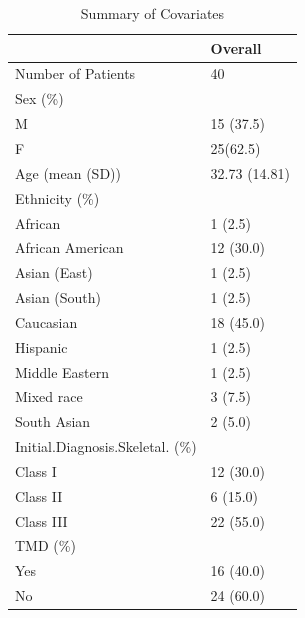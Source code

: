 \documentclass[AMA,Times1COL]{WileyNJDv5} %
\begin{document}
\begin{table}[h]
\centering
\begin{tabular}{l|l}
\hline
  & Overall\\
\hline
Number of Patients & 40\\
\hline
\hline
Sex (\%) & \\
\hline
M & 15 (37.5)\\
F & 25(62.5) \\
\hline
\hline
Age (mean (SD)) & 32.73 (14.81)\\
\hline
\hline
Ethnicity (\%) & \\
\hline
African & 1 (2.5)\\
African American & 12 (30.0)\\
Asian (East) & 1 (2.5)\\
Asian (South) & 1 (2.5)\\
Caucasian & 18 (45.0)\\
Hispanic & 1 (2.5)\\
Middle Eastern & 1 (2.5)\\
Mixed race & 3 (7.5)\\
South Asian & 2 (5.0)\\
\hline
\hline
Initial.Diagnosis.Skeletal. (\%) & \\
\hline
Class I & 12 (30.0)\\
Class II & 6 (15.0)\\
Class III & 22 (55.0)\\
\hline
\hline
TMD (\%)  & \\
\hline
Yes & 16 (40.0)\\
No  & 24 (60.0)\\
\hline
\hline
\end{tabular}
\caption{Summary of Covariates}
    \label{tab:description}
\end{table}
\end{document}

